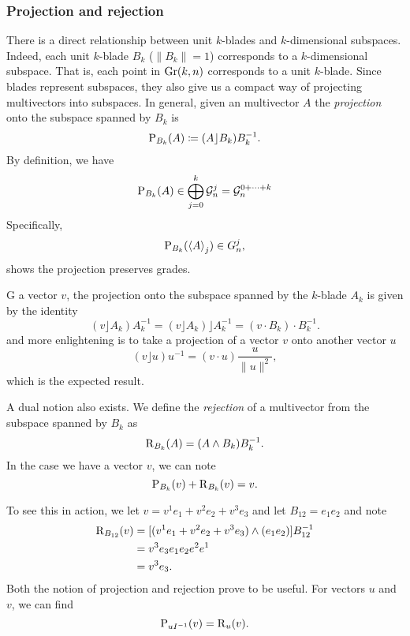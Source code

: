 \subsubsection{Projection and rejection}

There is a direct relationship between unit $k$-blades and $k$-dimensional subspaces.  Indeed, each unit $k$-blade $B_k$ ($\|B_k\|=1$) corresponds to a $k$-dimensional subspace.  That is, each point in $\Grassmannian{k}{n}$ corresponds to a unit $k$-blade.  Since blades represent subspaces, they also give us a compact way of projecting multivectors into subspaces.  In general, given an multivector $A$ the \emph{projection} onto the subspace spanned by $B_k$ is
\begin{equation}
\label{eq:projection}
\projection{B_k}{A} \coloneqq (A\rfloor B_k)B_k^{-1}.
\end{equation}
By definition, we have
\[
\projection{B_k}{A} \in \bigoplus_{j=0}^k \G_n^j = \G_n^{0+\cdots + k}
\]
Specifically,
\[
\projection{B_k}{\proj{j}{A}} \in G_n^j,
\]
shows the projection preserves grades.

G a vector $v$, the projection onto the subspace spanned by the $k$-blade $A_k$ is given by the identity
\begin{equation}
\label{eq:vector_projection}
(v\rfloor A_k )A_k^{-1} = (v\rfloor A_k)\rfloor A_k^{-1} = (v\cdot B_k)\cdot B_k^{-1}.
\end{equation}
and more enlightening is to take a projection of a vector $v$ onto another vector $u$
\[
(v\rfloor u)u^{-1} = (v \cdot u) \frac{u}{\|u\|^2},
\]
which is the expected result. 

A dual notion also exists.  We define the \emph{rejection} of a multivector from the subspace spanned by $B_k$ as
\begin{equation}
\label{eq:rejection}
\rejection_{B_k}(A) = (A\wedge B_k)B_k^{-1}.
\end{equation}
In the case we have a vector $v$, we can note
\begin{equation}
\label{eq:projection+rejection_vector}
\projection{B_k}{v} + \rejection_{B_k}(v) = v.
\end{equation}

To see this in action, we let $v=v^1 e_1 + v^2 e_2 + v^3 e_3$ and let $B_{12}=e_1 e_2$ and note
\begin{align*}
    \rejection_{B_{12}}(v) &= [(v^1 e_1 + v^2 e_2 + v^3 e_3)\wedge (e_1 e_2)]B_{12}^{-1}\\
    &= v^3 e_3 e_1 e_2 e^2 e^1 \\
    &= v^3 e_3.
\end{align*}
Both the notion of projection and rejection prove to be useful. For vectors $u$ and $v$, we can find
\begin{equation}
\label{eq:projection_rejection_vector}
\projection{uI^{-1}}{v} = \rejection_u(v).
\end{equation}

